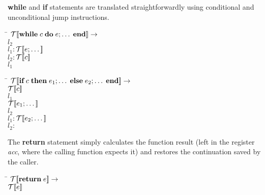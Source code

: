 %
{\bf while} and {\bf if} statements are translated straightforwardly
using conditional and unconditional jump instructions.
%
\begin{tabbing}
\qquad \= \quad \kill
${\mathcal{T}{\normalfont [\![} \text{\bf while}\; c\;\text{\bf do}\; e;\dots\;\text{\bf end} {\normalfont ]\!]}} \rightarrow$\\
 $l_2$\\
$l_1:$\>${\mathcal{T}{\normalfont [\![} e;\dots {\normalfont ]\!]}}$\\
$l_2:$\>${\mathcal{T}{\normalfont [\![} c {\normalfont ]\!]}}$\\
 $l_1$
\end{tabbing}

\begin{tabbing}
\qquad \= \quad \kill
${\mathcal{T}{\normalfont [\![} \text{\bf if}\; c\;\text{\bf then}\; e_1;\dots\;\text{\bf else}\; e_2;\dots\;\text{\bf end} {\normalfont ]\!]}} \rightarrow$\\
\>${\mathcal{T}{\normalfont [\![} c {\normalfont ]\!]}}$\\
 $l_1$\\
\>${\mathcal{T}{\normalfont [\![} e_1;\dots {\normalfont ]\!]}}$\\
 $l_2$\\
$l_1:$\>${\mathcal{T}{\normalfont [\![} e_2;\dots {\normalfont ]\!]}}$\\
$l_2:$
\end{tabbing}
%
The {\bf return} statement simply calculates the function result (left
in the register {\em acc}, where the calling function expects it) and
restores the continuation saved by the caller.
%
\begin{tabbing}
\qquad \= \quad \kill
${\mathcal{T}{\normalfont [\![} \text{\bf return}\; e {\normalfont ]\!]}} \rightarrow$\\
\>${\mathcal{T}{\normalfont [\![} e {\normalfont ]\!]}}$\\
\end{tabbing}


